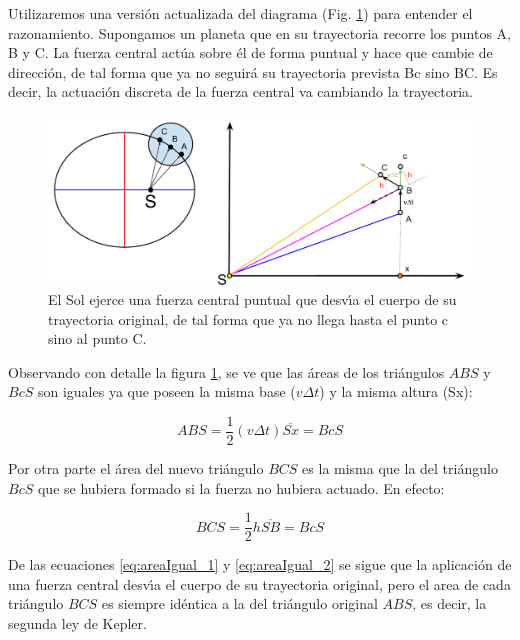 Utilizaremos una versi\'on actualizada del diagrama (Fig. \ref{fig:keplerFromNewton}) para entender el razonamiento. Supongamos un planeta que en su trayectoria recorre los puntos A, B y C. La fuerza central act\'ua sobre \'el de forma puntual y hace que cambie de direcci\'on, de tal forma que ya no seguir\'a su trayectoria prevista Bc sino BC. Es decir, la actuaci\'on discreta de la fuerza central va cambiando la trayectoria.


\begin{figure}[h]
  \includegraphics[width=\linewidth]{leyKeplerfromNewton.pdf}%
  \caption{El Sol ejerce una fuerza central puntual que desv\'\i{}a el cuerpo de su trayectoria original, de tal forma que ya no llega hasta el punto c sino al punto C.}
  \label{fig:keplerFromNewton}%
\end{figure}



Observando con detalle la figura \ref{fig:keplerFromNewton}, se ve que las \'areas de los tri\'angulos $ABS$ y $BcS$ son iguales ya que poseen la misma base ($v\Delta t$) y la misma altura (Sx):

\begin{equation}
ABS=\frac{1}{2}(v\Delta t) \overline{Sx}=BcS
\label{eq:areaIgual_1}
\end{equation}

Por otra parte el \'area del nuevo tri\'angulo $BCS$ es la misma que la del tri\'angulo $BcS$ que se hubiera formado si la fuerza no hubiera actuado. En efecto:

\begin{equation}
BCS =\frac{1}{2}h\overline{SB}=BcS
\label{eq:areaIgual_2}
\end{equation}


De las ecuaciones \ref{eq:areaIgual_1} y \ref{eq:areaIgual_2} se sigue que la aplicaci\'on de una fuerza central  desv\'\i{}a el cuerpo de su trayectoria original, pero el area de cada tri\'angulo $BCS$ es siempre id\'entica a la del tri\'angulo original $ABS$, es decir, la segunda ley de Kepler.

